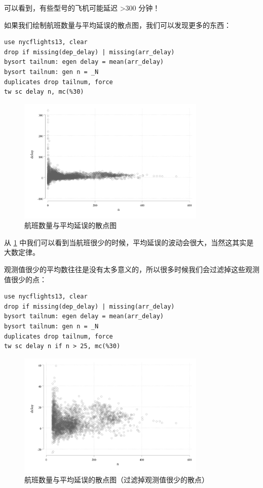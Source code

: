 \documentclass[]{ctexbook}
\begin{document}
可以看到，有些型号的飞机可能延迟 \textgreater{}300 分钟！

如果我们绘制航班数量与平均延误的散点图，我们可以发现更多的东西：

\begin{lstlisting}
use nycflights13, clear
drop if missing(dep_delay) | missing(arr_delay)
bysort tailnum: egen delay = mean(arr_delay)
bysort tailnum: gen n = _N
duplicates drop tailnum, force
tw sc delay n, mc(%30)
\end{lstlisting}

\begin{figure}

{\centering \includegraphics[width=0.8\textwidth]{assets/scdelayn} 

}

\caption{航班数量与平均延误的散点图}\label{fig:scdelayn}
\end{figure}

从 \ref{fig:scdelayn} 中我们可以看到当航班很少的时候，平均延误的波动会很大，当然这其实是大数定律。

观测值很少的平均数往往是没有太多意义的，所以很多时候我们会过滤掉这些观测值很少的点：

\begin{lstlisting}
use nycflights13, clear
drop if missing(dep_delay) | missing(arr_delay)
bysort tailnum: egen delay = mean(arr_delay)
bysort tailnum: gen n = _N
duplicates drop tailnum, force
tw sc delay n if n > 25, mc(%30)
\end{lstlisting}

\begin{figure}

{\centering \includegraphics[width=0.8\textwidth]{assets/scdelayn2} 

}

\caption{航班数量与平均延误的散点图（过滤掉观测值很少的散点）}\label{fig:scdelayn2}
\end{figure}
\end{document}
